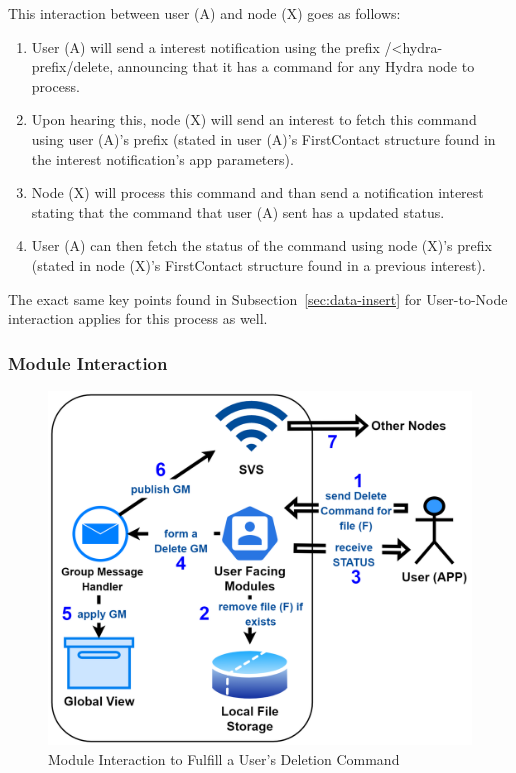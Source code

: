 This interaction between user (A) and node (X) goes as follows:
\begin{enumerate}
    \item User (A) will send a interest notification using the prefix /<hydra-prefix/delete, announcing that it has a command for any Hydra node to process.
    \item Upon hearing this, node (X) will send an interest to fetch this command using user (A)'s prefix (stated in user (A)'s FirstContact structure found in the interest notification's app parameters).
    \item Node (X) will process this command and than send a notification interest stating that the command that user (A) sent has a updated status.
    \item User (A) can then fetch the status of the command using node (X)'s prefix (stated in node (X)'s FirstContact structure found in a previous interest).
\end{enumerate}

The exact same key points found in Subsection~\ref{sec:data-insert} for User-to-Node interaction applies for this process as well.


\subsubsection{Module Interaction} 
\begin{figure}[!ht]
    \centering
    \includegraphics[width=\columnwidth]{visuals/delete-sys.png}
    \caption{Module Interaction to Fulfill a User's Deletion Command}
    \label{fig:delete-sys}
\end{figure}

